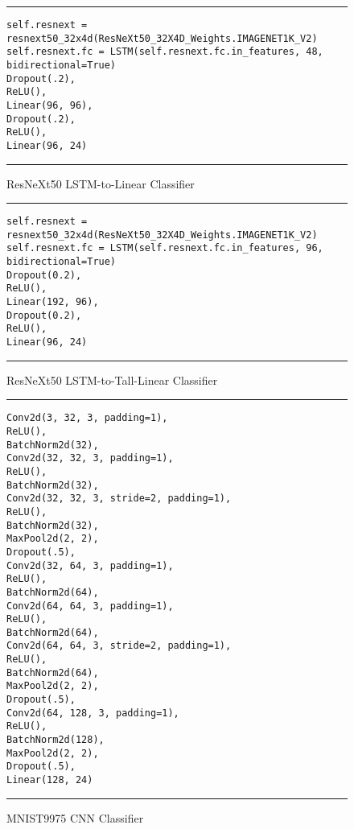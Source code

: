 \begin{figure}
  \caption{ResNeXt50 LSTM-to-Linear Classifier}
  \label{fig:cnnResNeXt50LSTM2Linear}
  \par\noindent\rule{\textwidth}{0.5pt}
  \begin{\codefigsize}
  \begin{lstlisting}
self.resnext = resnext50_32x4d(ResNeXt50_32X4D_Weights.IMAGENET1K_V2)
self.resnext.fc = LSTM(self.resnext.fc.in_features, 48, bidirectional=True)
Dropout(.2),
ReLU(),
Linear(96, 96),
Dropout(.2),
ReLU(),
Linear(96, 24)
  \end{lstlisting}
  \end{\codefigsize}
  \par\noindent\rule{\textwidth}{0.5pt}
\end{figure}

\begin{figure}
  \caption{ResNeXt50 LSTM-to-Tall-Linear Classifier}
  \label{fig:cnnResNeXt50LSTM2TallLinear}
  \par\noindent\rule{\textwidth}{0.5pt}
  \begin{\codefigsize}
  \begin{lstlisting}
self.resnext = resnext50_32x4d(ResNeXt50_32X4D_Weights.IMAGENET1K_V2)
self.resnext.fc = LSTM(self.resnext.fc.in_features, 96, bidirectional=True)
Dropout(0.2),
ReLU(),
Linear(192, 96),
Dropout(0.2),
ReLU(),
Linear(96, 24)
  \end{lstlisting}
  \end{\codefigsize}
  \par\noindent\rule{\textwidth}{0.5pt}
\end{figure}

\begin{figure}
  \caption{MNIST9975 CNN Classifier}
  \label{fig:cnnMNISTCNN}
  \par\noindent\rule{\textwidth}{0.5pt}
  \begin{\codefigsize}
  \begin{lstlisting}
Conv2d(3, 32, 3, padding=1),
ReLU(),
BatchNorm2d(32),
Conv2d(32, 32, 3, padding=1),
ReLU(),
BatchNorm2d(32),
Conv2d(32, 32, 3, stride=2, padding=1),
ReLU(),
BatchNorm2d(32),
MaxPool2d(2, 2),
Dropout(.5),
Conv2d(32, 64, 3, padding=1),
ReLU(),
BatchNorm2d(64),
Conv2d(64, 64, 3, padding=1),
ReLU(),
BatchNorm2d(64),
Conv2d(64, 64, 3, stride=2, padding=1),
ReLU(),
BatchNorm2d(64),
MaxPool2d(2, 2),
Dropout(.5),
Conv2d(64, 128, 3, padding=1),
ReLU(),
BatchNorm2d(128),
MaxPool2d(2, 2),
Dropout(.5),
Linear(128, 24)
  \end{lstlisting}
  \end{\codefigsize}
  \par\noindent\rule{\textwidth}{0.5pt}
\end{figure}

